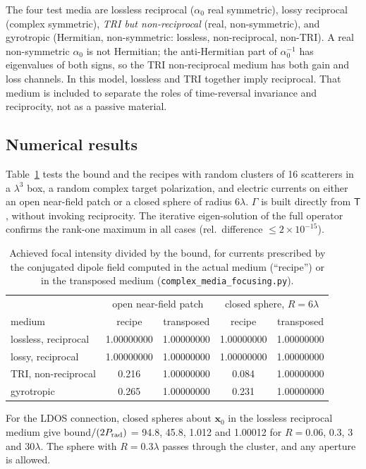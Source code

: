 \documentclass[11pt,letterpaper]{article}
\newcommand{\vect}[1]{\mathbf{#1}}
\newcommand{\xv}{\vect{x}}
\newcommand{\code}[1]{\texttt{\small #1}}
\begin{document}
The four test media are lossless reciprocal ($\alpha_0$ real symmetric), lossy reciprocal (complex symmetric), \emph{TRI but non-reciprocal} (real, non-symmetric), and gyrotropic (Hermitian, non-symmetric: lossless, non-reciprocal, non-TRI). A real non-symmetric $\alpha_0$ is not Hermitian; the anti-Hermitian part of $\alpha_0^{-1}$ has eigenvalues of both signs, so the TRI non-reciprocal medium has both gain and loss channels. In this model, lossless and TRI together imply reciprocal. That medium is included to separate the roles of time-reversal invariance and reciprocity, not as a passive material.

\subsection{Numerical results}
Table~\ref{tab:recipe} tests the bound and the recipes with random clusters of 16 scatterers in a $\lambda^3$ box, a random complex target polarization, and electric currents on either an open near-field patch or a closed sphere of radius $6\lambda$. $\Gamma$ is built directly from $\mathsf T$, without invoking reciprocity. The iterative eigen-solution of the full operator confirms the rank-one maximum in all cases (rel.\ difference $\le2\times10^{-15}$).

\begin{table}[tb]
\centering
\caption{Achieved focal intensity divided by the bound, for currents prescribed by the conjugated dipole field computed in the actual medium (``recipe'') or in the transposed medium (\code{complex\_media\_focusing.py}).}
\label{tab:recipe}
\begin{tabular}{lcccc}
\toprule
 & \multicolumn{2}{c}{open near-field patch} & \multicolumn{2}{c}{closed sphere, $R=6\lambda$}\\
medium & recipe & transposed & recipe & transposed\\
\midrule
lossless, reciprocal & 1.00000000 & 1.00000000 & 1.00000000 & 1.00000000\\
lossy, reciprocal & 1.00000000 & 1.00000000 & 1.00000000 & 1.00000000\\
TRI, non-reciprocal & 0.216 & 1.00000000 & 0.084 & 1.00000000\\
gyrotropic & 0.265 & 1.00000000 & 0.231 & 1.00000000\\
\bottomrule
\end{tabular}
\end{table}

For the LDOS connection, closed spheres about $\xv_0$ in the lossless reciprocal medium give bound$/(2P_{\rm rad})$ = 94.8, 45.8, 1.012 and 1.00012 for $R=0.06$, 0.3, 3 and $30\lambda$. The sphere with $R=0.3\lambda$ passes through the cluster, and any aperture is allowed.
\end{document}
